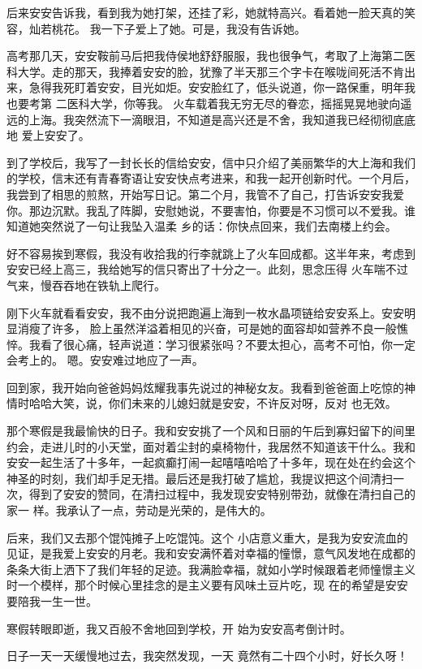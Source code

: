 \documentclass{article}
\begin{document}
后来安安告诉我，看到我为她打架，还挂了彩，她就特高兴。看着她一脸天真的笑容，灿若桃花。
我一下子爱上了她。可是，我没有告诉她。 

高考那几天，安安鞍前马后把我侍侯地舒舒服服，我也很争气，考取了上海第二医科大学。走的那天，我捧着安安的脸，犹豫了半天那三个字卡在喉咙间死活不肯出来，急得我死盯着安安，目光如炬。安安脸红了，低头说道，你一路保重，明年我也要考第
\newpage
二医科大学，你等我。 火车载着我无穷无尽的眷恋，摇摇晃晃地驶向遥远的上海。我突然流下一滴眼泪，不知道是高兴还是不舍，我知道我已经彻彻底底地
爱上安安了。 

到了学校后，我写了一封长长的信给安安，信中只介绍了美丽繁华的大上海和我们的学校，信末还有青春寄语让安安快点考进来，和我一起开创新时代。一个月后，我尝到了相思的煎熬，开始写日记。第二个月，我管不了自己，打告诉安安我爱你。那边沉默。我乱了阵脚，安慰她说，不要害怕，你要是不习惯可以不爱我。谁知道她突然说了一句让我坠入温柔
乡的话：你快点回来，我们去南楼上约会。 

好不容易挨到寒假，我没有收拾我的行李就跳上了火车回成都。这半年来，考虑到安安已经上高三，我给她写的信只寄出了十分之一。此刻，思念压得
火车喘不过气来，慢吞吞地在铁轨上爬行。 

刚下火车就看看安安，我不由分说把跑遍上海到一枚水晶项链给安安系上。安安明显消瘦了许多，
\newpage
脸上虽然洋溢着相见的兴奋，可是她的面容却如营养不良一般憔悴。我看了很心痛，轻声说道：学习很紧张吗？不要太担心，高考不可怕，你一定会考上的。
嗯。安安难过地应了一声。 

回到家，我开始向爸爸妈妈炫耀我事先说过的神秘女友。我看到爸爸面上吃惊的神情时哈哈大笑，说，你们未来的儿媳妇就是安安，不许反对呀，反对
也无效。 

那个寒假是我最愉快的日子。我和安安挑了一个风和日丽的午后到寡妇留下的间里约会，走进儿时的小天堂，面对着尘封的桌椅物什，我居然不知道该干什么。我和安安一起生活了十多年，一起疯癫打闹一起嘻嘻哈哈了十多年，现在处在约会这个神圣的时刻，我们却手足无措。最后还是我打破了尴尬，我提议把这个间清扫一次，得到了安安的赞同，在清扫过程中，我发现安安特别带劲，就像在清扫自己的家一
样。我承认了一点，劳动是光荣的，是伟大的。 

后来，我们又去那个馄饨摊子上吃馄饨。这个
\newpage
小店意义重大，是我为安安流血的见证，是我爱上安安的月老。我和安安满怀着对幸福的憧憬，意气风发地在成都的条条大街上洒下了我们年轻的足迹。我满脸幸福，就如小学时候跟着老师憧憬主义时一个模样，那个时候心里挂念的是主义要有风味土豆片吃，现
在的希望是安安要陪我一生一世。 

寒假转眼即逝，我又百般不舍地回到学校，开
始为安安高考倒计时。 

日子一天一天缓慢地过去，我突然发现，一天
竟然有二十四个小时，好长久呀！ 
\end{document}
